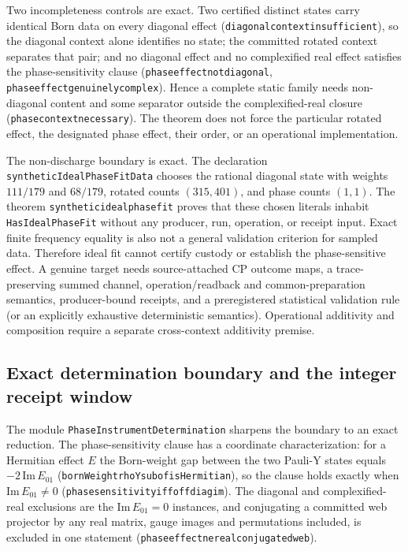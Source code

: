 \documentclass[11pt]{article}
\renewcommand{\_}{\textunderscore\allowbreak}
\theoremstyle{remark}
\begin{document}
Two incompleteness controls are exact. Two certified distinct states carry identical Born
data on every diagonal effect (\texttt{diagonal\_context\_insufficient}),
so the diagonal context alone identifies no state; the committed rotated
context separates that pair; and no diagonal effect and no complexified
real effect satisfies the phase-sensitivity clause
(\texttt{phase\_effect\_not\_diagonal},
\texttt{phase\_effect\_genuinely\_complex}). Hence a complete static family
needs non-diagonal content and some separator outside the complexified-real
closure (\texttt{phase\_context\_necessary}). The theorem does not force the
particular rotated effect, the designated phase effect, their order, or an
operational implementation.

The non-discharge boundary is exact. The declaration
\texttt{syntheticIdealPhaseFitData} chooses the rational diagonal state with
weights $111/179$ and $68/179$, rotated counts $(315,401)$, and phase counts
$(1,1)$. The theorem \texttt{synthetic\_ideal\_phase\_fit} proves that these
chosen literals inhabit \texttt{HasIdealPhaseFit} without any producer, run,
operation, or receipt input. Exact finite frequency equality is also not a
general validation criterion for sampled data. Therefore ideal fit cannot
certify custody or establish the phase-sensitive effect. A genuine target needs
source-attached CP outcome maps, a trace-preserving summed channel,
operation/readback and common-preparation semantics, producer-bound receipts,
and a preregistered statistical validation rule (or an explicitly exhaustive
deterministic semantics). Operational additivity and composition require a
separate cross-context additivity premise.

\subsection{Exact determination boundary and the integer receipt window}
\label{sec:phase-determination}

The module \texttt{PhaseInstrumentDetermination} sharpens the boundary to
an exact reduction. The phase-sensitivity clause has a coordinate
characterization: for a Hermitian effect $E$ the Born-weight gap between the
two Pauli-Y states equals $-2\,\mathrm{Im}\,E_{01}$
(\texttt{bornWeight\_rhoY\_sub\_of\_isHermitian}), so the clause holds exactly
when $\mathrm{Im}\,E_{01} \neq 0$
(\texttt{phase\_sensitivity\_iff\_offdiag\_im}). The diagonal and
complexified-real exclusions are the $\mathrm{Im}\,E_{01} = 0$ instances, and
conjugating a committed web projector by any real matrix, gauge images and
permutations included, is excluded in one statement
(\texttt{phase\_effect\_ne\_real\_conjugated\_web}).
\end{document}

